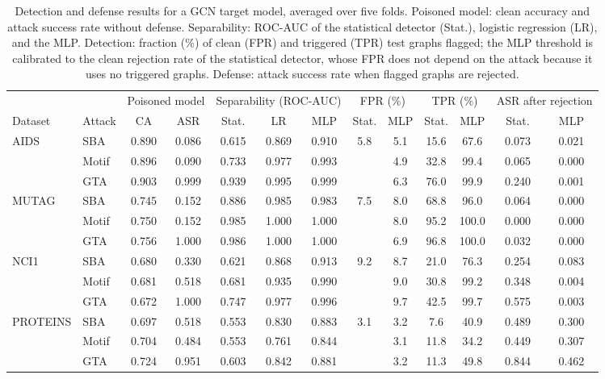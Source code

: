 \documentclass[journal]{IEEEtran}
\newcommand{\tabstyle}{%
  \footnotesize
  \setlength{\tabcolsep}{3pt}%
  \renewcommand{\arraystretch}{1.15}%
}
\begin{document}
\begin{table}[t]
\caption{Detection and defense results for a GCN target model, averaged over
five folds. Poisoned model: clean accuracy and attack success rate without
defense. Separability: ROC-AUC of the statistical detector (Stat.), logistic
regression (LR), and the MLP. Detection: fraction (\%) of clean (FPR) and
triggered (TPR) test graphs flagged; the MLP threshold is calibrated to the
clean rejection rate of the statistical detector, whose FPR does not depend on
the attack because it uses no triggered graphs. Defense: attack success rate
when flagged graphs are rejected.}
\label{tab:results}
\centering
\tabstyle
\begin{tabular}{ll cc ccc cc cc cc}
\toprule
 & &
\multicolumn{2}{c}{Poisoned model} &
\multicolumn{3}{c}{Separability (ROC-AUC)} &
\multicolumn{2}{c}{FPR (\%)} &
\multicolumn{2}{c}{TPR (\%)} &
\multicolumn{2}{c}{ASR after rejection} \\
\cmidrule(lr){3-4}\cmidrule(lr){5-7}\cmidrule(lr){8-9}\cmidrule(lr){10-11}\cmidrule(lr){12-13}
Dataset & Attack & CA & ASR &
Stat. & LR & MLP &
Stat. & MLP &
Stat. & MLP &
Stat. & MLP \\
\midrule
AIDS     & SBA   & 0.890 & 0.086 & 0.615 & 0.869 & 0.910 & \multirow{3}{*}{5.8} & 5.1 & 15.6 &  67.6 & 0.073 & 0.021 \\
         & Motif & 0.896 & 0.090 & 0.733 & 0.977 & 0.993 &                      & 4.9 & 32.8 &  99.4 & 0.065 & 0.000 \\
         & GTA   & 0.903 & 0.999 & 0.939 & 0.995 & 0.999 &                      & 6.3 & 76.0 &  99.9 & 0.240 & 0.001 \\
\midrule
MUTAG    & SBA   & 0.745 & 0.152 & 0.886 & 0.985 & 0.983 & \multirow{3}{*}{7.5} & 8.0 & 68.8 &  96.0 & 0.064 & 0.000 \\
         & Motif & 0.750 & 0.152 & 0.985 & 1.000 & 1.000 &                      & 8.0 & 95.2 & 100.0 & 0.000 & 0.000 \\
         & GTA   & 0.756 & 1.000 & 0.986 & 1.000 & 1.000 &                      & 6.9 & 96.8 & 100.0 & 0.032 & 0.000 \\
\midrule
NCI1     & SBA   & 0.680 & 0.330 & 0.621 & 0.868 & 0.913 & \multirow{3}{*}{9.2} & 8.7 & 21.0 &  76.3 & 0.254 & 0.083 \\
         & Motif & 0.681 & 0.518 & 0.681 & 0.935 & 0.990 &                      & 9.0 & 30.8 &  99.2 & 0.348 & 0.004 \\
         & GTA   & 0.672 & 1.000 & 0.747 & 0.977 & 0.996 &                      & 9.7 & 42.5 &  99.7 & 0.575 & 0.003 \\
\midrule
PROTEINS & SBA   & 0.697 & 0.518 & 0.553 & 0.830 & 0.883 & \multirow{3}{*}{3.1} & 3.2 &  7.6 &  40.9 & 0.489 & 0.300 \\
         & Motif & 0.704 & 0.484 & 0.553 & 0.761 & 0.844 &                      & 3.1 & 11.8 &  34.2 & 0.449 & 0.307 \\
         & GTA   & 0.724 & 0.951 & 0.603 & 0.842 & 0.881 &                      & 3.2 & 11.3 &  49.8 & 0.844 & 0.462 \\
\bottomrule
\end{tabular}
\end{table}
\end{document}
